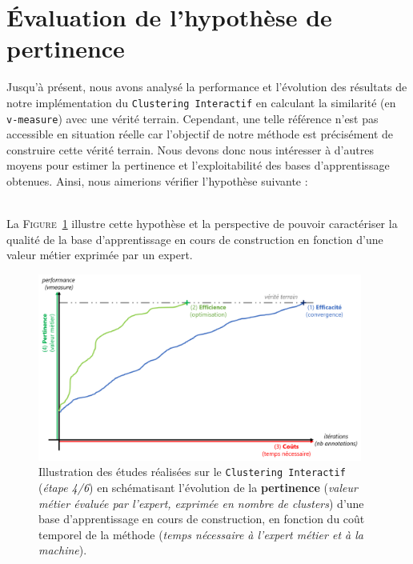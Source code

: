 \section{Évaluation de l'hypothèse de pertinence}
\label{section:4.4-HYPOTHESE-PERTINENCE}

	Jusqu'à présent, nous avons analysé la performance et l'évolution des résultats de notre implémentation du \texttt{Clustering Interactif} en calculant la similarité (en \texttt{v-measure}) avec une vérité terrain.
	Cependant, une telle référence n'est pas accessible en situation réelle car l'objectif de notre méthode est précisément de construire cette vérité terrain.
	Nous devons donc nous intéresser à d'autres moyens pour estimer la pertinence et l'exploitabilité des bases d'apprentissage obtenues.
	Ainsi, nous aimerions vérifier l'hypothèse suivante :
	
	\begin{tcolorbox}[
		title=\faVial~\textbf{Hypothèse de pertinence}~\faVial,
		colback=colorTcolorboxHypothesis!15,
		colframe=colorTcolorboxHypothesis!75,
		width=\linewidth
	]
		 \\
		
		La \textsc{Figure~\ref{figure:4.4-HYPOTHESE-PERTINENCE}} illustre cette hypothèse et la perspective de pouvoir caractériser la qualité de la base d'apprentissage en cours de construction en fonction d'une valeur métier exprimée par un expert.
		\begin{figure}[H]  %
			\centering
			\includegraphics[width=0.95\textwidth]{figures/hypotheses-04-pertinence}
			\caption{
				Illustration des études réalisées sur le \texttt{Clustering Interactif} (\textit{étape 4/6}) en schématisant l'évolution de la \textbf{pertinence} (\textit{valeur métier évaluée par l'expert, exprimée en nombre de clusters}) d'une base d'apprentissage en cours de construction, en fonction du coût temporel de la méthode (\textit{temps nécessaire à l'expert métier et à la machine}).
			}
			\label{figure:4.4-HYPOTHESE-PERTINENCE}
		\end{figure}
	\end{tcolorbox}
		
